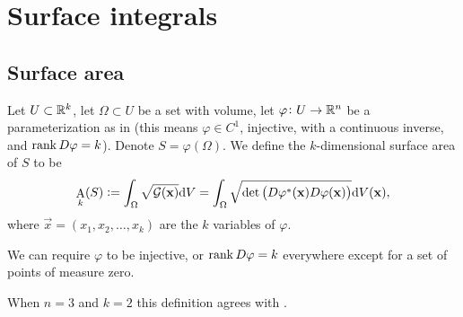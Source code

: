 \documentclass[11pt,a4paper]{article}
\DeclareMathOperator{\A}{A} %
\begin{document}
\newpage

\section{Surface integrals}
\label{sec:surface-integrals}
\subsection{Surface area}
\begin{definition}
  \label{def:k-surface-area}
  Let $U \subset \mathbb{R}^k$,
  let $\Omega \subset U$ be a set with volume,
  let $\varphi \colon U \to \mathbb{R}^n$ be a parameterization as in
   (this means $\varphi \in C^1$, injective,
  with a continuous inverse, and $\operatorname{rank} D \varphi = k$).
  Denote $S = \varphi(\Omega)$.
  We define the $k$-dimensional surface area of $S$ to be
  \[
    \A_k(S) :=
    \int_{\Omega} \sqrt{\mathcal G(\vec x)} \dV =
    \int_{\Omega}
      \sqrt{\det\del{D\varphi^*(\vec x) D\varphi(\vec x)}} \dV(\vec x),
  \]
  where $\vec x = (x_1,x_2,\dots,x_k)$ are the $k$ variables of $\varphi$.
\end{definition}
\begin{remark}
  We can require $\varphi$ to be injective,
  or $\operatorname{rank} D\varphi = k$ everywhere except for a set of points
  of measure zero.
\end{remark}
\begin{remark}
  When $n = 3$ and $k = 2$ this definition agrees with
  .
\end{remark}
\end{document}
